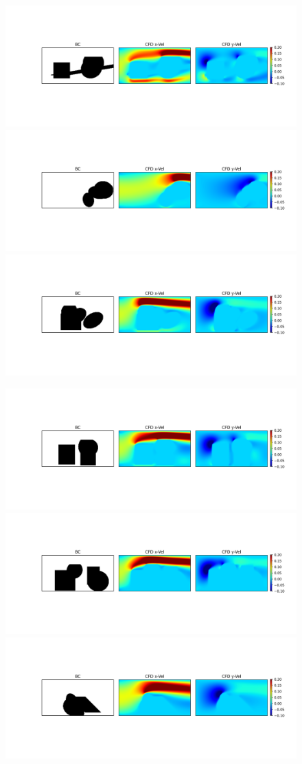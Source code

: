 \documentclass{beamer}
\begin{document}
\begin{frame}
\begin{figure}[h]
\includegraphics[height=0.16\linewidth, trim = 3.680cm 4.35cm 18.98cm 4.29cm, clip]{../../../plots/plots/train_data/montage_train_data_07.png}%
\includegraphics[height=0.16\linewidth, trim = 3.680cm 4.35cm 18.98cm 4.29cm, clip]{../../../plots/plots/train_data/montage_train_data_08.png}%
\includegraphics[height=0.16\linewidth, trim = 3.680cm 4.35cm 18.98cm 4.29cm, clip]{../../../plots/plots/train_data/montage_train_data_09.png}%

\includegraphics[height=0.16\linewidth, trim = 3.680cm 4.35cm 18.98cm 4.29cm, clip]{../../../plots/plots/train_data/montage_train_data_10.png}%
\includegraphics[height=0.16\linewidth, trim = 3.680cm 4.35cm 18.98cm 4.29cm, clip]{../../../plots/plots/train_data/montage_train_data_11.png}%
\includegraphics[height=0.16\linewidth, trim = 3.680cm 4.35cm 18.98cm 4.29cm, clip]{../../../plots/plots/train_data/montage_train_data_12.png}%
\end{figure}
\end{frame}
\end{document}
